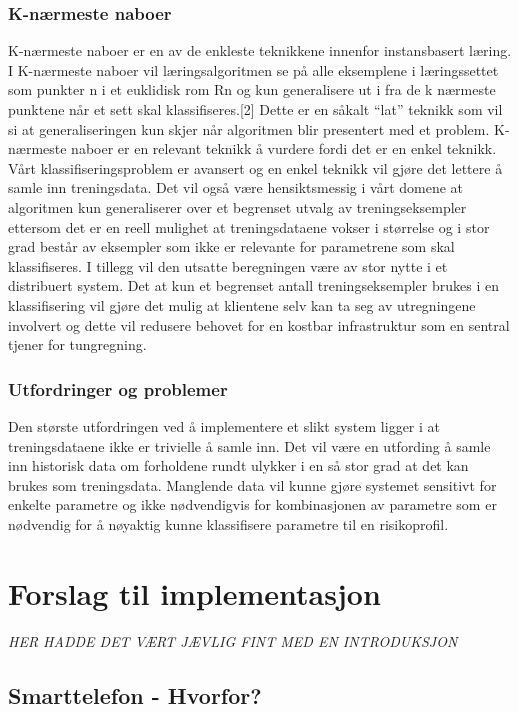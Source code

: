\documentclass[a4paper,norsk,oneside]{book}
\begin{document}
\subsection{K-nærmeste naboer}
K-nærmeste naboer er en av de enkleste teknikkene innenfor instansbasert læring. I K-nærmeste naboer vil læringsalgoritmen se på alle eksemplene i læringssettet som punkter n i et euklidisk rom Rn og kun generalisere ut i fra de k nærmeste punktene når et sett skal klassifiseres.[2] Dette er en såkalt “lat” teknikk som vil si at generaliseringen kun skjer når algoritmen blir presentert med et problem. K-nærmeste naboer er en relevant teknikk å vurdere fordi det er en enkel teknikk. Vårt klassifiseringsproblem er avansert og en enkel teknikk vil gjøre det lettere å samle inn treningsdata. Det vil også være hensiktsmessig i vårt domene at algoritmen kun generaliserer over et begrenset utvalg av treningseksempler ettersom det er en reell mulighet at treningsdataene vokser i størrelse og i stor grad består av eksempler som ikke er relevante for parametrene som skal klassifiseres. I tillegg vil den utsatte beregningen være av stor nytte i et distribuert system. Det at kun et begrenset antall treningseksempler brukes i en klassifisering vil gjøre det mulig at klientene selv kan ta seg av utregningene involvert og dette vil redusere behovet for en kostbar infrastruktur som en sentral tjener for tungregning.

\subsection{Utfordringer og problemer}
Den største utfordringen ved å implementere et slikt system ligger i at treningsdataene ikke er trivielle å samle inn. Det vil være en utfording å samle inn historisk data om forholdene rundt ulykker i en så stor grad at det kan brukes som treningsdata. Manglende data vil kunne gjøre systemet sensitivt for enkelte parametre og ikke nødvendigvis for kombinasjonen av parametre som er nødvendig for å nøyaktig kunne klassifisere parametre til en risikoprofil.  

\chapter{Forslag til implementasjon}
\label{cha:implementasjon}

{\it HER HADDE DET VÆRT JÆVLIG FINT MED EN INTRODUKSJON }

\section{Smarttelefon - Hvorfor?}
\label{sec:smarttelefon}
\end{document}
